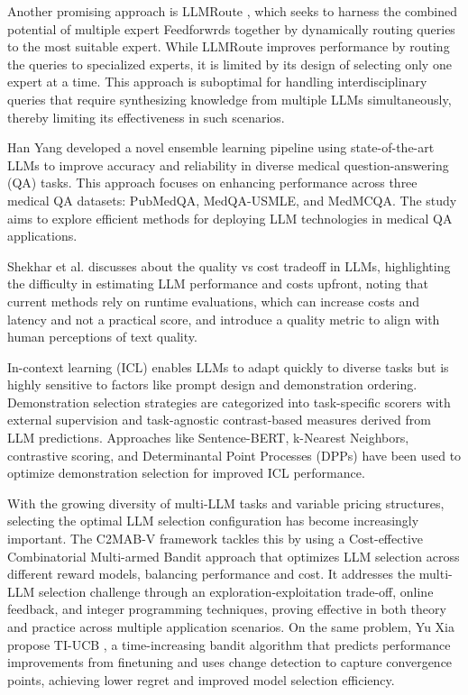 \documentclass[sigconf,authordraft]{acmart}
\begin{document}
Another promising approach is LLMRoute \cite{srivatsa2024harnessing, deepseekai2024deepseekv3technicalreport}
, which seeks to harness the combined potential of multiple expert Feedforwrds together by dynamically routing queries to the most suitable expert. While LLMRoute improves performance by routing the queries to specialized experts, it is limited by its design of selecting only one expert at a time. This approach is suboptimal for handling interdisciplinary queries that require synthesizing knowledge from multiple LLMs simultaneously, thereby limiting its effectiveness in such scenarios.


Han Yang developed a novel ensemble learning pipeline using state-of-the-art LLMs to improve accuracy and reliability in diverse medical question-answering (QA) tasks. This approach focuses on enhancing performance across three medical QA datasets: PubMedQA, MedQA-USMLE, and MedMCQA. The study aims to explore efficient methods for deploying LLM technologies in medical QA applications.

Shekhar et al. discusses about the quality vs cost tradeoff in LLMs, highlighting the difficulty in estimating LLM performance and costs upfront, noting that current methods rely on runtime evaluations, which can increase costs and latency and not a practical score, and introduce a quality metric to align with human perceptions of text quality.

In-context learning (ICL) enables LLMs to adapt quickly to diverse tasks but is highly sensitive to factors like prompt design and demonstration ordering. Demonstration selection strategies are categorized into task-specific scorers with external supervision and task-agnostic contrast-based measures derived from LLM predictions. Approaches like Sentence-BERT, k-Nearest Neighbors, contrastive scoring, and Determinantal Point Processes (DPPs) have been used to optimize demonstration selection for improved ICL performance.\cite{izacard2022unsuperviseddenseinformationretrieval}


With the growing diversity of multi-LLM tasks and variable pricing structures, selecting the optimal LLM selection configuration has become increasingly important. The C2MAB-V framework \cite{dai2024costeffectiveonlinemultillmselection} tackles this by using a Cost-effective Combinatorial Multi-armed Bandit approach that optimizes LLM selection across different reward models, balancing performance and cost. It addresses the multi-LLM selection challenge through an exploration-exploitation trade-off, online feedback, and integer programming techniques, proving effective in both theory and practice across multiple application scenarios. On the same problem, Yu Xia  propose TI-UCB \cite{xia2024llmplayconvergenceawareonline}, a time-increasing bandit algorithm that predicts performance improvements from finetuning and uses change detection to capture convergence points, achieving lower regret and improved model selection efficiency.
\end{document}
